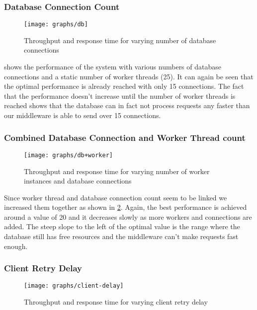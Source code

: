 \documentclass[a4paper, oneside]{csthesis}
\begin{document}
\newpage
\subsubsection{Database Connection Count}
    \begin{figure}[ht]
    \centering
        \texttt{[image: graphs/db]}
        \caption{Throughput and response time for varying number of database connections}
        \label{fig:db}
    \end{figure}
    
     shows the performance of the system with various numbers of database connections and
    a static number of worker threads (25). It can again be seen that the optimal performance is already
    reached with only 15 connections. The fact that the performance doesn't increase until the number
    of worker threads is reached shows that the database can in fact not process requests any faster
    than our middleware is able to send over 15 connections.

\newpage
\subsubsection{Combined Database Connection and Worker Thread count}
    \begin{figure}[ht]
    \centering
        \texttt{[image: graphs/db+worker]}
        \caption{Throughput and response time for varying number of worker instances and database connections}
        \label{fig:db+worker}
    \end{figure}
    
    Since worker thread and database connection count seem to be linked we increased them together as shown in
    \cref{fig:db+worker}. Again, the best performance is achieved around a value of 20 and it decreases
    slowly as more workers and connections are added. The steep slope to the left of the optimal value
    is the range where the database still has free resources and the middleware can't make requests
    fast enough. 

\newpage
\subsubsection{Client Retry Delay}
    \begin{figure}[ht]
    \centering
        \texttt{[image: graphs/client-delay]}
        \caption{Throughput and response time for varying client retry delay}
        \label{fig:client-delay}
    \end{figure}
    
\end{document}
